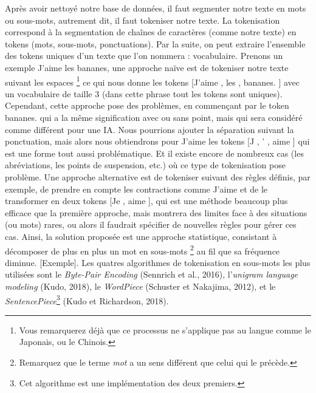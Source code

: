 \documentclass[12pt, french]{report}
\begin{document}
Après avoir nettoyé notre base de données, il faut segmenter notre texte en mots ou sous-mots, autrement dit, il faut tokeniser notre texte. La tokenisation correspond à la segmentation de chaînes de caractères (comme notre texte) en tokens (mots, sous-mots, ponctuations). Par la suite, on peut extraire l'ensemble des tokens uniques d'un texte que l'on nommera : vocabulaire.
Prenons un exemple \og J'aime les bananes\fg, une approche naïve est de tokeniser notre texte suivant les espaces \footnote{Vous remarquerez déjà que ce processus ne s'applique pas au langue comme le Japonais, ou le Chinois.} ce qui nous donne les tokens [\og J'aime \fg, \og les \fg, \og bananes. \fg] avec un vocabulaire de taille 3 (dans cette phrase tout les tokens sont uniques). Cependant, cette approche pose des problèmes, en commençant par le token \og bananes. \fg qui a la même signification avec ou sans point, mais qui sera considéré comme différent pour une IA. Nous pourrions ajouter la séparation suivant la ponctuation, mais alors nous obtiendrons pour \og J'aime \fg les tokens [\og J \fg, \og ' \fg, \og aime \fg] qui est une forme tout aussi problématique. Et il existe encore de nombreux cas (les abréviations, les points de suspension, etc.) où ce type de tokenisation pose problème. Une approche alternative est de tokeniser suivant des règles définis, par exemple, de prendre en compte les contractions comme \og J'aime \fg et de le transformer en deux tokens [\og Je \fg, \og aime \fg], qui est une méthode beaucoup plus efficace que la première approche, mais montrera des limites face à des situations (ou mots) rares, ou alors il faudrait spécifier de nouvelles règles pour gérer ces cas. Ainsi, la solution proposée est une approche statistique, consistant à décomposer de plus en plus un mot en sous-mots \footnote{Remarquez que le terme \textit{mot} a un sens différent que celui qui le précède.} au fil que sa fréquence diminue. [Exemple]. Les quatres algorithmes de tokenisation en sous-mots les plus utilisées sont le \textit{Byte-Pair Encoding} (Sennrich et al., 2016), l'\textit{unigram language modeling} (Kudo, 2018), le \textit{WordPiece} (Schuster et Nakajima, 2012), et le \textit{SentencePiece}\footnote{Cet algorithme est une implémentation des deux premiers.} (Kudo et Richardson, 2018).\\
\end{document}
